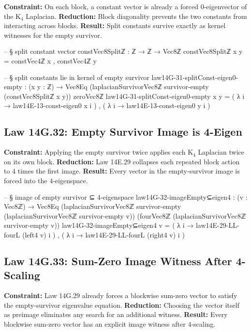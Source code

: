 \documentclass[11pt,a4paper]{book}
\def\Rightarrow{=>}%
\def\texorpdfstring#1#2{#2}%
\begin{document}
\textbf{Constraint:} On each block, a constant vector is already a forced $0$-eigenvector of the K$_4$ Laplacian.
\textbf{Reduction:} Block diagonality prevents the two constants from interacting across blocks.
\textbf{Result:} Split constants survive exactly as kernel witnesses for the empty survivor.

\begin{code}
-- § split constant vector
constVec8Splitℤ : ℤ → ℤ → Vec8ℤ
constVec8Splitℤ x y = constVec4ℤ x , constVec4ℤ y

-- § split constants lie in kernel of empty survivor
law14G-31-splitConst-eigen0-empty : (x y : ℤ) → Vec8Eq (laplacianSurvivorVec8ℤ survivor-empty (constVec8Splitℤ x y)) zeroVec8ℤ
law14G-31-splitConst-eigen0-empty x y =
  ( λ i → law14E-13-const-eigen0 x i ) ,
  ( λ i → law14E-13-const-eigen0 y i )
\end{code}

\subsection{Law 14G.32: Empty Survivor Image is 4-Eigen}

\textbf{Constraint:} Applying the empty survivor twice applies each K$_4$ Laplacian twice on its own block.
\textbf{Reduction:} Law 14E.29 collapses each repeated block action to $4$ times the first image.
\textbf{Result:} Every vector in the empty-survivor image is forced into the $4$-eigenspace.

\begin{code}
-- § image of empty survivor ⊆ 4-eigenspace
law14G-32-imageEmpty⊆eigen4 : (v : Vec8ℤ) →
  Vec8Eq (laplacianSurvivorVec8ℤ survivor-empty (laplacianSurvivorVec8ℤ survivor-empty v))
        (fourVec8ℤ (laplacianSurvivorVec8ℤ survivor-empty v))
law14G-32-imageEmpty⊆eigen4 v =
  ( λ i → law14E-29-LL-fourL (left4 v) i ) ,
  ( λ i → law14E-29-LL-fourL (right4 v) i )
\end{code}

\subsection{Law 14G.33: Sum-Zero \texorpdfstring{$\Rightarrow$}{} Image Witness After 4-Scaling}

\textbf{Constraint:} Law 14G.29 already forces a blockwise sum-zero vector to satisfy the empty-survivor eigenvalue equation.
\textbf{Reduction:} Choosing the vector itself as preimage eliminates any search for an additional witness.
\textbf{Result:} Every blockwise sum-zero vector has an explicit image witness after $4$-scaling.
\end{document}
